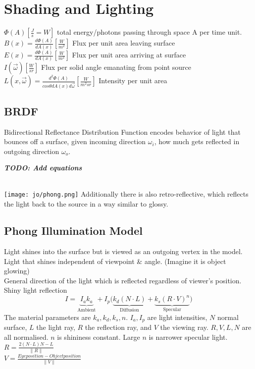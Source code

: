 \section{Shading and Lighting}
 $\Phi(A) [\frac{J}{s} = W]$ total energy/photons passing through space A per time unit.\\
 $B(x) = \frac{d\Phi(A)}{dA(x)} [\frac{W}{m^2}]$ Flux per unit area leaving surface \\
 $E(x) = \frac{d\Phi(A)}{dA(x)}[\frac{W}{m^2}]$ Flux per unit area arriving at surface\\
 $I(\overrightarrow{\omega}) [\frac{W}{sr}]$ Flux per solid angle emanating from point source\\
 $L(x, \overrightarrow{\omega}) = \frac{d^2 \Phi(A)}{cos\theta dA(x) d\overrightarrow{\omega}} [\frac{W}{m^2 sr}]$ Intensity per unit area
\subsection*{BRDF}
Bidirectional Reflectance Distribution Function encodes behavior of light that bounces off a surface, given incoming direction $\omega_i$, how much gets reflected in outgoing direction $\omega_o$. 


\textit{\textbf{TODO: Add equations }}

\\
\texttt{[image: jo/phong.png]}
Additionally there is also retro-reflective, which reflects the light back to the source in a way similar to glossy. 

\subsection*{Phong Illumination Model}
Light shines into the surface but is viewed as an outgoing vertex in the model.\\
 Light that shines independent of viewpoint \& angle. (Imagine it is object glowing) \\
 General direction of the light which is reflected regardless of viewer's position.\\
 Shiny light reflection
$$I = \underbrace{I_ak_a }_\text{Ambient} + I_p \bigl( \underbrace{k_d(N \cdot L)}_\text{Diffusion} + \underbrace{k_s(R \cdot V)^n}_\text{Specular} \bigr)$$
The material parameters are $k_a, k_d, k_s, n$. $I_a, I_p$ are light intensities, $N$ normal surface, $L$ the light ray, $R$ the reflection ray, and $V$ the viewing ray. $R, V, L, N$ are all normalised. $n$ is shininess constant. Large $n$ is narrower specular light. \\
$R = \frac{2(N \cdot L)N - L}{\lVert R \rVert} $ \\
$V = \frac{Eye position - Object position}{\lVert V \rVert} $
